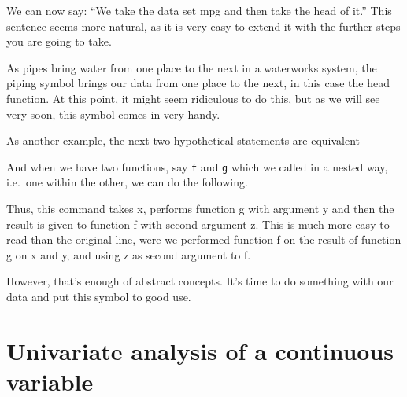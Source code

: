 \documentclass[]{tufte-book}
\newenvironment{Shaded}{}{}
\newcommand{\CommentTok}[1]{\textcolor[rgb]{0.38,0.63,0.69}{\textit{#1}}}
\newcommand{\KeywordTok}[1]{\textcolor[rgb]{0.00,0.44,0.13}{\textbf{#1}}}
\newcommand{\NormalTok}[1]{#1}
\newcommand{\OperatorTok}[1]{\textcolor[rgb]{0.40,0.40,0.40}{#1}}
\newcommand{\StringTok}[1]{\textcolor[rgb]{0.25,0.44,0.63}{#1}}
\begin{document}
We can now say: ``We take the data set mpg and then take the head of it.'' This sentence seems more natural, as it is very easy to extend it with the further steps you are going to take.

As pipes bring water from one place to the next in a waterworks system, the piping symbol brings our data from one place to the next, in this case the head function. At this point, it might seem ridiculous to do this, but as we will see very soon, this symbol comes in very handy.

As another example, the next two hypothetical statements are equivalent

\begin{Shaded}
\end{Shaded}

And when we have two functions, say \texttt{f} and \texttt{g} which we called in a nested way, i.e.~one within the other, we can do the following.

\begin{Shaded}
\end{Shaded}

Thus, this command takes x, performs function g with argument y and then the result is given to function f with second argument z. This is much more easy to read than the original line, were we performed function f on the result of function g on x and y, and using z as second argument to f.

However, that's enough of abstract concepts. It's time to do something with our data and put this symbol to good use.

\hypertarget{univariate-analysis-of-a-continuous-variable}{%
\section{Univariate analysis of a continuous variable}\label{univariate-analysis-of-a-continuous-variable}}
\end{document}
